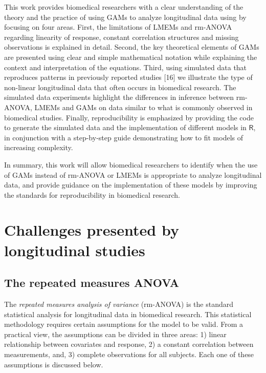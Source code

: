 \documentclass[
]{article}
\begin{document}
This work provides biomedical researchers with a clear understanding of the theory and the practice of using GAMs to analyze longitudinal data using by focusing on four areas. First, the limitations of LMEMs and rm-ANOVA regarding linearity of response, constant correlation structures and missing observations is explained in detail. Second, the key theoretical elements of GAMs are presented using clear and simple mathematical notation while explaining the context and interpretation of the equations. Third, using simulated data that reproduces patterns in previously reported studies {[}16{]} we illustrate the type of non-linear longitudinal data that often occurs in biomedical research. The simulated data experiments highlight the differences in inference between rm-ANOVA, LMEMs and GAMs on data similar to what is commonly observed in biomedical studies. Finally, reproducibility is emphasized by providing the code to generate the simulated data and the implementation of different models in \(\textsf{R}\), in conjunction with a step-by-step guide demonstrating how to fit models of increasing complexity.

In summary, this work will allow biomedical researchers to identify when the use of GAMs instead of rm-ANOVA or LMEMs is appropriate to analyze longitudinal data, and provide guidance on the implementation of these models by improving the standards for reproducibility in biomedical research.

\hypertarget{challenges-presented-by-longitudinal-studies}{%
\section{Challenges presented by longitudinal studies}\label{challenges-presented-by-longitudinal-studies}}

\hypertarget{the-repeated-measures-anova}{%
\subsection{The repeated measures ANOVA}\label{the-repeated-measures-anova}}

The \emph{repeated measures analysis of variance} (rm-ANOVA) is the standard statistical analysis for longitudinal data in biomedical research. This statistical methodology requires certain assumptions for the model to be valid. From a practical view, the assumptions can be divided in three areas: 1) linear relationship between covariates and response, 2) a constant correlation between measurements, and, 3) complete observations for all subjects. Each one of these assumptions is discussed below.
\end{document}

